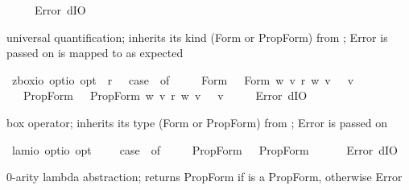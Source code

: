 \begin{isabellebody}
\ \ {\isacharbar}\ {\isacharunderscore}\ {\isasymRightarrow}\ Error\ dIO{\isachardoublequoteclose}%
\begin{isamarkuptext}%
universal quantification;  inherits its kind (Form or PropForm) from \isa{{\isasymphi}}; Error is passed on
 is mapped to  as expected%
\end{isamarkuptext}%
\isamarkuptrue%
\isamarkupfalse%
\ z{\isacharunderscore}box{\isacharcolon}{\isacharcolon}{\isachardoublequoteopen}io\ opt{\isasymRightarrow}io\ opt{\isachardoublequoteclose}\ \ {\isachardoublequoteopen}{\isasymbox}\isactrlsup r\ {\isasymphi}\ {\isasymequiv}\ case\ {\isasymphi}\ of\ \isanewline
\ \ \ \ Form\ {\isasympsi}\ {\isasymRightarrow}\ Form\ {\isacharparenleft}{\isasymlambda}w{\isachardot}\ {\isasymforall}v{\isachardot}\ {\isacharparenleft}r\ w\ v{\isacharparenright}\ {\isasymlongrightarrow}\ {\isasympsi}\ v{\isacharparenright}\isanewline
\ \ {\isacharbar}\ PropForm\ {\isasympsi}\ {\isasymRightarrow}\ PropForm\ {\isacharparenleft}{\isasymlambda}w{\isachardot}\ {\isasymforall}v{\isachardot}\ {\isacharparenleft}r\ w\ v{\isacharparenright}\ {\isasymlongrightarrow}\ {\isasympsi}\ v{\isacharparenright}\isanewline
\ \ {\isacharbar}\ {\isacharunderscore}\ {\isasymRightarrow}\ Error\ dIO{\isachardoublequoteclose}%
\begin{isamarkuptext}%
box operator;  inherits its type (Form or PropForm) from \isa{{\isasymphi}}; Error is passed on%
\end{isamarkuptext}%
\isamarkuptrue%
\isamarkupfalse%
\ lam{}{\isacharcolon}{\isacharcolon}{\isachardoublequoteopen}io\ opt{\isasymRightarrow}io\ opt{\isachardoublequoteclose}\ \ {\isachardoublequoteopen}{\isasymlambda}\ {\isasymphi}\ {\isasymequiv}\ case\ {\isasymphi}\ of\ \isanewline
\ \ \ \ PropForm\ {\isasympsi}\ {\isasymRightarrow}\ PropForm\ {\isasympsi}\isanewline
\ \ {\isacharbar}\ {\isacharunderscore}\ {\isasymRightarrow}\ Error\ dIO{\isachardoublequoteclose}%
\begin{isamarkuptext}%
0-arity lambda abstraction;  returns PropForm \isa{{\isasymphi}} if \isa{{\isasymphi}} is a PropForm, otherwise Error%

\end{isamarkuptext}
\end{isabellebody}
